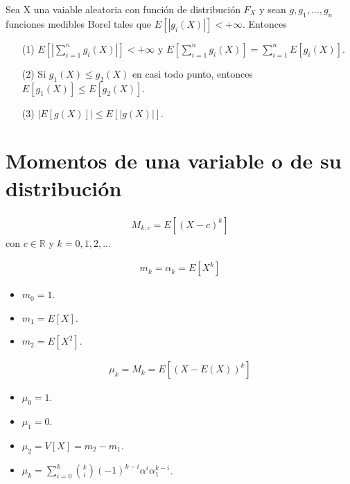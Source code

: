 \begin{prop}
Sea X una vaiable aleatoria con función de distribución $F_X$ y sean $g,g_1,...,g_n$ funciones medibles Borel tales que $E[|g_i(X)|] < +\infty$. Entonces
\begin{enumerate}
    \item[(1)] $E[|\sum_{i=1}^{n}g_i(X)|] < +\infty$ y $E[\sum_{i=1}^{n}g_i(X)] = \sum_{i=1}^{n}{E[g_i(X)]}$.
    \item[(2)] Si $g_1(X) \leq g_2(X)$ en casi todo punto, entonces $E[g_1(X)] \leq E[g_2(X)]$.
    \item[(3)] $|E[g(X)]| \leq E[|g(X)|]$.
\end{enumerate}
\end{prop}

\section{Momentos de una variable o de su distribución}

\begin{defi}
\begin{align*}
    M_{k,c} = E[(X - c)^k]
\end{align*}
con $c \in \mathbb{R}$ y $k = 0, 1, 2,...$
\end{defi}

\begin{defi}
\begin{align*}
    m_k = \alpha_k = E[X^k]
\end{align*}
\begin{itemize}
    \item $m_0 = 1$.
    \item $m_1 = E[X]$.
    \item $m_2 = E[X^2]$.
\end{itemize}
\end{defi}

\begin{defi}
\begin{align*}
    \mu_k = M_k =  E[(X - E(X))^k]
\end{align*}
\begin{itemize}
    \item $\mu_0 = 1$.
    \item $\mu_1 = 0$.
    \item $\mu_2 = V[X] = m_2 - m_1$.
    \item $\mu_k = \sum_{i=0}^{k}\binom{k}{i}(-1)^{k-i}\alpha^i\alpha_1^{k-i}$.
\end{itemize}
\end{defi}

